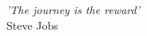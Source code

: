 \cleardoublepage
\thispagestyle{plain}

\vspace*{8cm}

\begin{flushright}
   \textsl{'The journey is the reward'} \\
\vspace*{1.5cm}
           Steve Jobs
\end{flushright}
